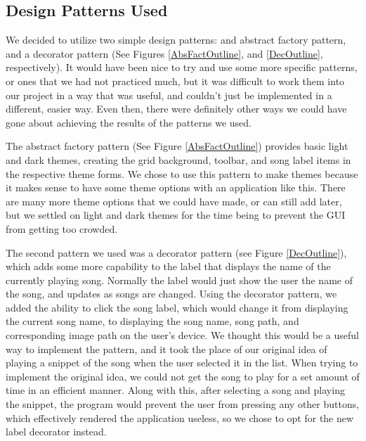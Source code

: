 \documentclass[10pt,conference,onecolumn,compsoc]{IEEEtran}
\begin{document}
\subsection{Design Patterns Used}
We decided to utilize two simple design patterns: and abstract factory pattern, and a decorator pattern (See Figures \ref{AbsFactOutline}, and \ref{DecOutline}, respectively). It would have been nice to try and use some more specific patterns, or ones that we had not practiced much, but it was difficult to work them into our project in a way that was useful, and couldn't just be implemented in a different, easier way. Even then, there were definitely other ways we could have gone about achieving the results of the patterns we used.

The abstract factory pattern (See Figure \ref{AbsFactOutline}) provides basic light and dark themes, creating the grid background, toolbar, and song label items in the respective theme forms. We chose to use this pattern to make themes because it makes sense to have some theme options with an application like this. There are many more theme options that we could have made, or can still add later, but we settled on light and dark themes for the time being to prevent the GUI from getting too crowded.

The second pattern we used was a decorator pattern (see Figure \ref{DecOutline}), which adds some more capability to the label that displays the name of the currently playing song. Normally the label would just show the user the name of the song, and updates as songs are changed. Using the decorator pattern, we added the ability to click the song label, which would change it from displaying the current song name, to displaying the song name, song path, and corresponding image path on the user's device. 
We thought this would be a useful way to implement the pattern, and it took the place of our original idea of playing a snippet of the song when the user selected it in the list. When trying to implement the original idea, we could not get the song to play for a set amount of time in an efficient manner. Along with this, after selecting a song and playing the snippet, the program would prevent the user from pressing any other buttons, which effectively rendered the application useless, so we chose to opt for the new label decorator instead.
\end{document}

